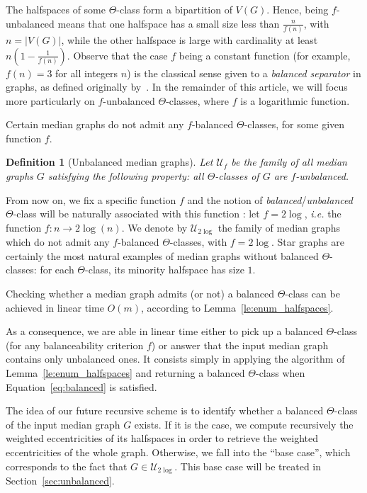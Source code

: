 \documentclass[11pt,letterpaper]{article}
\newtheorem{definition}{Definition}
\newcommand{\ulog}{\mathcal{U}_{2\log}}
\begin{document}
The halfspaces of some $\Theta$-class form a bipartition of $V(G)$. Hence, being $f$-unbalanced means that one halfspace has a small size less than $\frac{n}{f(n)}$, with $n = \vert V(G) \vert$, while the other halfspace is large with cardinality at least $n(1-\frac{1}{f(n)})$. Observe that the case $f$ being a constant function (for example, $f(n) = 3$ for all integers $n$) is the classical sense given to a \textit{balanced separator} in graphs, as defined originally by~\cite{LiTa79}. In the remainder of this article, we will focus more particularly on $f$-unbalanced $\Theta$-classes, where $f$ is a logarithmic function. 

Certain median graphs do not admit any $f$-balanced $\Theta$-classes, for some given function $f$. 

\begin{definition}[Unbalanced median graphs]
Let $\mathcal{U}_f$ be the family of all median graphs $G$ satisfying the following property: all $\Theta$-classes of $G$ are $f$-unbalanced. 
\label{def:unbalanced_median}
\end{definition}

From now on, we fix a specific function $f$ and the notion of \textit{balanced}/\textit{unbalanced} $\Theta$-class will be naturally associated with this function : let $f = 2\log$, {\em i.e.} the function $f : n \rightarrow 2\log(n)$. We denote by $\ulog$ the family of median graphs which do not admit any $f$-balanced $\Theta$-classes, with $f = 2\log$. Star graphs are certainly the most natural examples of median graphs without balanced $\Theta$-classes: for each $\Theta$-class, its minority halfspace has size $1$.

Checking whether a median graph admits (or not) a balanced $\Theta$-class can be achieved in linear time $O(m)$, according to Lemma~\ref{le:enum_halfspaces}. 

As a consequence, we are able in linear time either to pick up a balanced $\Theta$-class (for any balanceability criterion $f$) or answer that the input median graph contains only unbalanced ones. It consists simply in applying the algorithm of Lemma~\ref{le:enum_halfspaces} and returning a balanced $\Theta$-class when Equation~\eqref{eq:balanced} is satisfied.

The idea of our future recursive scheme is to identify whether a balanced $\Theta$-class of the input median graph $G$ exists. If it is the case, we compute recursively the weighted eccentricities of its halfspaces in order to retrieve the weighted eccentricities of the whole graph. Otherwise, we fall into the ``base case'', which corresponds to the fact that $G \in \ulog$. This base case will be treated in Section~\ref{sec:unbalanced}.
\end{document}
